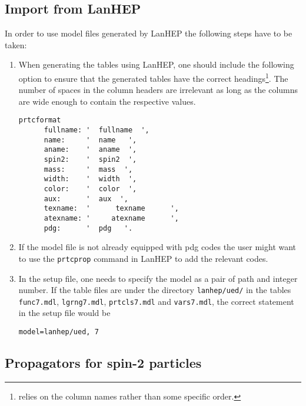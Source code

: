 \subsection{Import from LanHEP}
In order to use model files generated by LanHEP the following steps
have to be taken:
\begin{enumerate}
\item When generating the tables using LanHEP, one should include the
   following option to ensure that the generated tables have the correct
   headings\footnote{\gosamv{} relies on the column names rather than
   some specific order.}. The number of spaces in the column headers are
   irrelevant as long as the columns are wide enough to contain the
   respective values.
\begin{lstlisting}[style=in]
   prtcformat
      fullname: '  fullname  ',
      name:     '  name   ',
      aname:    '  aname  ',
      spin2:    '  spin2  ',
      mass:     '  mass  ',
      width:    '  width  ',
      color:    '  color  ',
      aux:      '  aux  ',
      texname:  '      texname      ',
      atexname: '     atexname      ',
      pdg:      '  pdg   '.
\end{lstlisting}
\item If the model file is not already equipped with pdg codes
   the user might want to use the \verb!prtcprop! command in
   LanHEP to add the relevant codes.
\item In the setup file, one needs to specify the model as a pair
   of path and integer number. If the table files are under the directory
   \texttt{lanhep/ued/} in the tables \texttt{func7.mdl}, \texttt{lgrng7.mdl},
   \texttt{prtcls7.mdl} and \texttt{vars7.mdl}, the correct statement in
   the setup file would be
\begin{lstlisting}[style=in]
   model=lanhep/ued, 7
\end{lstlisting}
\end{enumerate}

\subsection{Propagators for spin-2 particles}
\label{sec:spin2}

